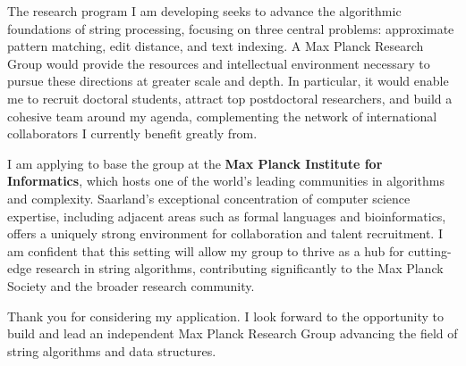\documentclass[11pt,a4paper,sans]{moderncv}
\begin{document}
The research program I am developing seeks to advance the algorithmic foundations of string processing, focusing on three central problems: approximate pattern matching, edit distance, and text indexing. A Max Planck Research Group would provide the resources and intellectual environment necessary to pursue these directions at greater scale and depth. In particular, it would enable me to recruit doctoral students, attract top postdoctoral researchers, and build a cohesive team around my agenda, complementing the network of international collaborators I currently benefit greatly from.

I am applying to base the group at the \textbf{Max Planck Institute for Informatics}, which hosts one of the world’s leading communities in algorithms and complexity. Saarland’s exceptional concentration of computer science expertise, including adjacent areas such as formal languages and bioinformatics, offers a uniquely strong environment for collaboration and talent recruitment. I am confident that this setting will allow my group to thrive as a hub for cutting-edge research in string algorithms, contributing significantly to the Max Planck Society and the broader research community.

Thank you for considering my application. I look forward to the opportunity to build and lead an independent Max Planck Research Group advancing the field of string algorithms and data structures.

\makeletterclosing

\end{document}

